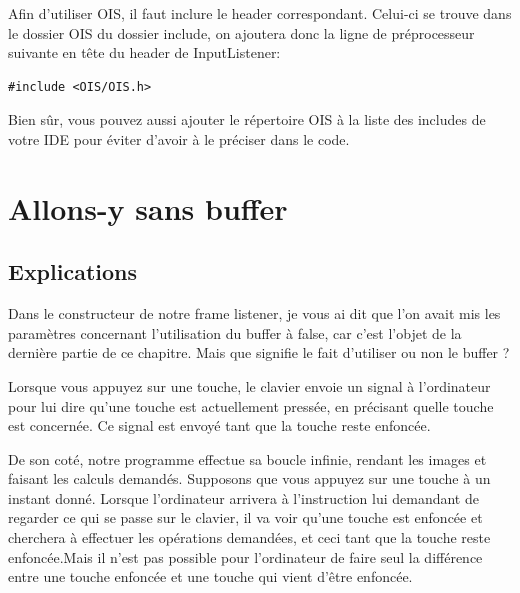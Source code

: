 \documentclass[10pt,a4paper]{report}
\begin{document}
Afin d'utiliser OIS, il faut inclure le header correspondant. Celui-ci se trouve dans le dossier OIS du dossier include, on ajoutera donc la ligne de pr\'eprocesseur suivante en t\^ete du header de InputListener:

\begin{lstlisting}[caption={Include OIS}]
#include <OIS/OIS.h>
\end{lstlisting}

Bien s\^ur, vous pouvez aussi ajouter le r\'epertoire OIS \`{a} la liste des includes de votre IDE pour \'eviter d'avoir \`{a} le pr\'eciser dans le code.




























\section{Allons-y sans buffer}
\subsection{Explications}
Dans le constructeur de notre frame listener, je vous ai dit que l'on avait mis les param\`etres concernant l'utilisation du buffer \`a false, car c'est l'objet de la derni\`ere partie de ce chapitre. Mais que signifie le fait d'utiliser ou non le buffer ?

Lorsque vous appuyez sur une touche, le clavier envoie un signal \`a l'ordinateur pour lui dire qu'une touche est actuellement press\'ee, en pr\'ecisant quelle touche est concern\'ee. Ce signal est envoy\'e tant que la touche reste enfonc\'ee.

De son cot\'e, notre programme effectue sa boucle infinie, rendant les images et faisant les calculs demand\'es. Supposons que vous appuyez sur une touche \`a un instant donn\'e. Lorsque l'ordinateur arrivera \`a l'instruction lui demandant de regarder ce qui se passe sur le clavier, il va voir qu'une touche est enfonc\'ee et cherchera \`a effectuer les op\'erations demand\'ees, et ceci tant que la touche reste enfonc\'ee.Mais il n'est pas possible pour l'ordinateur de faire seul la diff\'erence entre une touche enfonc\'ee et une touche qui vient d'\^etre enfonc\'ee.
\end{document}
